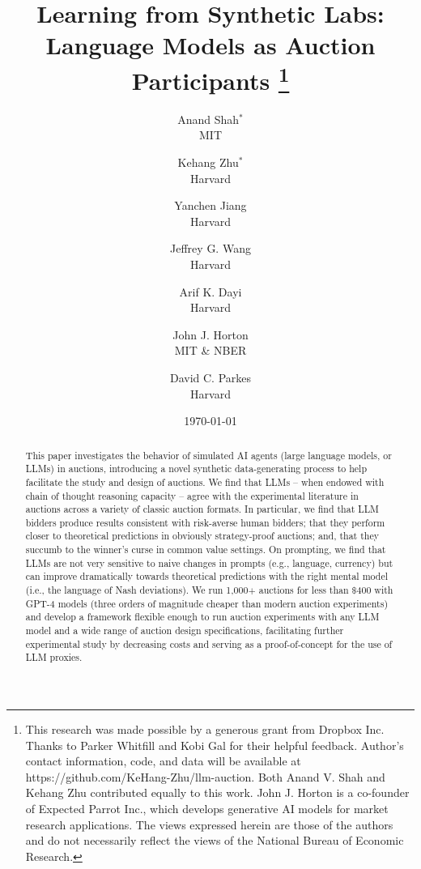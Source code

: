 \documentclass{article} %
\title{\vspace*{-1cm} Learning from Synthetic Labs: \\ Language Models as Auction Participants \thanks{
  \footnotesize
This research was made possible by a generous grant from Dropbox Inc. Thanks to Parker Whitfill and Kobi Gal for their helpful feedback. Author's contact information, code, and data will be available at https://github.com/KeHang-Zhu/llm-auction. Both Anand V. Shah and Kehang Zhu contributed equally to this work. John J. Horton is a co-founder of Expected Parrot Inc., which develops generative AI models for market research applications. The views expressed herein are those of the authors and do not necessarily reflect the views of the National Bureau of Economic Research.
}
}
\author{
  Anand Shah$^{*}$\\
  MIT \\
  \and
  Kehang Zhu$^{*}$\\
  Harvard  \\
  \and
  Yanchen Jiang \\
  Harvard \\
  \and
  Jeffrey G. Wang \\
  Harvard \\
  \and
  Arif K. Dayi \\
  Harvard \\
  \and
  John J. Horton \\
  MIT \& NBER \\
  \and
  David C. Parkes \\
  Harvard \\
}
\date{\today}
\begin{document}
\maketitle
\begin{abstract}
This paper investigates the behavior of simulated AI agents (large language models, or LLMs) in auctions, introducing a novel synthetic data-generating process to help facilitate the study and design of auctions. We find that LLMs -- when endowed with chain of thought reasoning capacity -- agree with the experimental literature in auctions across a variety of classic auction formats. In particular, we find that LLM bidders produce results consistent with risk-averse human bidders; that they perform closer to theoretical predictions in obviously strategy-proof auctions; and, that they succumb to the winner's curse in common value settings. On prompting, we find that LLMs are not very sensitive to naive changes in prompts (e.g., language, currency) but can improve dramatically towards theoretical predictions with the right mental model (i.e., the language of Nash deviations). We run 1,000$+$ auctions for less than $\$$400 with GPT-4 models (three orders of magnitude cheaper than modern auction experiments) and develop a framework flexible enough to run auction experiments with any LLM model and a wide range of auction design specifications, facilitating further experimental study by decreasing costs and serving as a proof-of-concept for the use of LLM proxies. 
\end{abstract}

\begin{titlepage}

\maketitle\makeatletter \gdef\@ACM@checkaffil{} \makeatother
\setcounter{tocdepth}{2} %

\end{titlepage}
\newpage


\newpage
\end{document}
